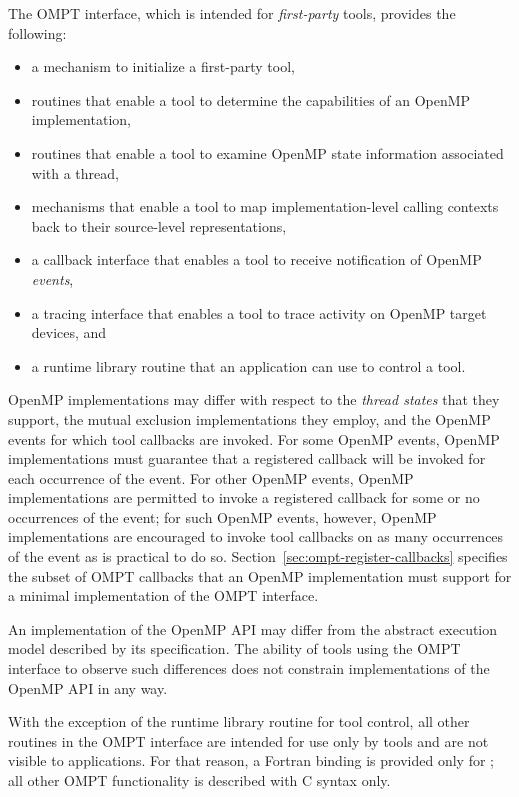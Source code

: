 The OMPT interface, which is intended for \emph{first-party} tools,
provides the following: 
\begin{itemize}
\item a mechanism to initialize a first-party tool,
\item routines that enable a tool to determine the capabilities of an
  OpenMP implementation,
\item routines that enable a tool to examine OpenMP state information associated with a thread,
\item mechanisms that enable a tool to map implementation-level calling
  contexts back to their source-level representations,
\item a callback interface that enables a tool to receive notification
  of OpenMP \emph{events},
\item a tracing interface that enables a tool to trace activity on OpenMP target devices, and
\item a runtime library routine that an application can use to control a tool.
\end{itemize}

OpenMP implementations may differ with respect to the \emph{thread states} that
they support, the mutual exclusion implementations they employ, 
and the OpenMP events for which tool callbacks are invoked. For some OpenMP events,
OpenMP implementations must guarantee that a registered callback will be invoked for each occurrence of the
event. For other OpenMP events, OpenMP implementations are permitted to invoke a registered callback for some
or no occurrences of the event; for such
OpenMP events, however,
OpenMP implementations are encouraged to invoke tool callbacks on as
many occurrences of the event as is practical to do so.
Section~\ref{sec:ompt-register-callbacks} specifies the subset of OMPT
callbacks that an OpenMP implementation must support for a minimal
implementation of the OMPT interface.

An implementation of the OpenMP API may differ from the
abstract execution model described by its specification.  The ability
of tools using the OMPT interface to observe such differences does not constrain
implementations of the OpenMP API in any way. 

With the exception of the  runtime library routine for tool control, 
all other routines in the OMPT interface are intended for use only by tools and
are not visible to applications.
For that reason, a Fortran binding is provided only 
for ;
all other OMPT functionality is described with C syntax only.

